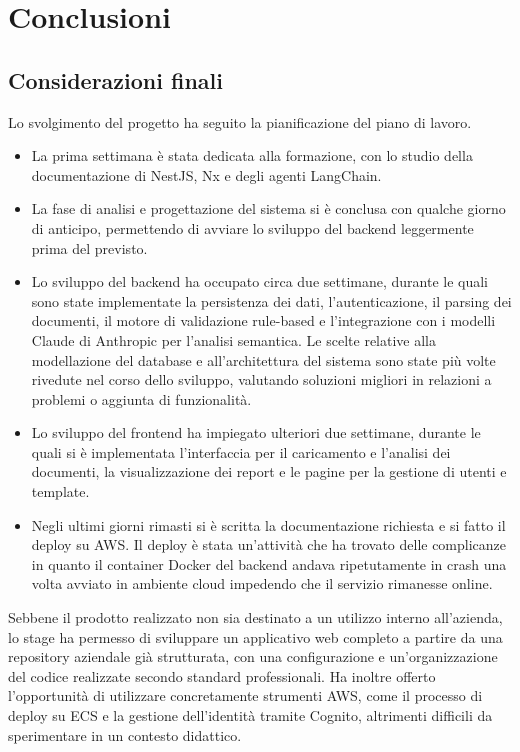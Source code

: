 \chapter{Conclusioni}
\label{cap:conclusioni}

\section{Considerazioni finali} 
Lo svolgimento del progetto ha seguito la pianificazione del piano di lavoro. 
\begin{itemize}
    \item La prima settimana è stata dedicata alla formazione, con lo studio della documentazione di NestJS, Nx e degli agenti LangChain.
    \item La fase di analisi e progettazione del sistema si è conclusa con qualche giorno di anticipo, permettendo di avviare lo sviluppo del backend leggermente prima del previsto.
    \item Lo sviluppo del backend ha occupato circa due settimane, durante le quali sono state implementate la persistenza dei dati, l'autenticazione, il parsing dei documenti, il motore di validazione rule-based e l'integrazione con i modelli Claude di Anthropic per l'analisi semantica. Le scelte relative alla modellazione del database e all'architettura del sistema sono state più volte rivedute nel corso dello sviluppo, valutando soluzioni migliori in relazioni a problemi o aggiunta di funzionalità.
    \item  Lo sviluppo del frontend ha impiegato ulteriori due settimane, durante le quali si è implementata l'interfaccia per il caricamento e l'analisi dei documenti, la visualizzazione dei report e le pagine per la gestione di utenti e template.
    \item Negli ultimi giorni rimasti si è scritta la documentazione richiesta e si fatto il deploy su AWS. Il deploy è stata un'attività che ha trovato delle complicanze in quanto il container Docker del backend andava ripetutamente in crash una volta avviato in ambiente cloud impedendo che il servizio rimanesse online.
\end{itemize}
Sebbene il prodotto realizzato non sia destinato a un utilizzo interno all'azienda, lo stage ha permesso di sviluppare un applicativo web completo a partire da una repository aziendale già strutturata, con una configurazione e un'organizzazione del codice realizzate secondo standard professionali. Ha inoltre offerto l'opportunità di utilizzare concretamente strumenti AWS, come il processo di deploy su ECS e la gestione dell'identità tramite Cognito, altrimenti difficili da sperimentare in un contesto didattico.

